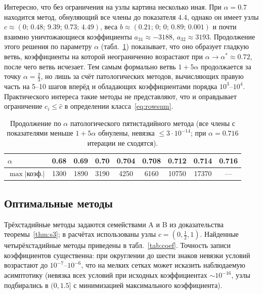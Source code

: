 \documentclass[11pt,a4paper]{article}
\theoremstyle{plain}
\theoremstyle{definition}
\begin{document}
Интересно, что без ограничения на узлы картина несколько иная. При $\alpha=0.7$ находится метод, обнуляющий все члены до показателя $4.4$, однако он имеет узлы $c\approx(0;\,0.48;\,9.39;\,0.73;\,4.49)$, веса $b\approx(0.21;\,0;\,0;\,0.89;\,0.001)$ и почти взаимно уничтожающиеся коэффициенты $a_{31}\approx-3188$, $a_{32}\approx3193$. Продолжение этого решения по параметру $\alpha$ (табл.~\ref{tab:path}) показывает, что оно образует гладкую ветвь, коэффициенты на которой неограниченно возрастают при $\alpha\to\alpha^*\approx0.72$, после чего ветвь исчезает. Тем самым формально ветвь $1+5\alpha$ продолжается за точку $\alpha=\frac23$, но лишь за счёт патологических методов, вычисляющих правую часть на 5--10 шагов вперёд и обладающих коэффициентами порядка $10^3$--$10^4$. Практического интереса такие методы не представляют, что и оправдывает ограничение $c_i\le\hat c$ в определении класса~\eqref{eq:rowsum}.

\begin{table}[ht]
\centering\small
\caption{Продолжение по $\alpha$ патологического пятистадийного метода (все члены с показателями меньше $1+5\alpha$ обнулены, невязка $\le3\cdot10^{-14}$; при $\alpha=0.716$ итерации не сходятся).}\label{tab:path}
\begin{tabular}{lcccccccc}
\toprule
$\alpha$ & 0.68 & 0.69 & 0.70 & 0.704 & 0.708 & 0.712 & 0.714 & 0.716\\
\midrule
$\max|\text{коэф.}|$ & 1300 & 1890 & 3190 & 4250 & 6160 & 10750 & 17370 & ---\\
\bottomrule
\end{tabular}
\end{table}

\subsection{Оптимальные методы}\label{sec:opt}

Трёхстадийные методы задаются семействами A и B из доказательства теоремы~\ref{thm:s3}; в расчётах использованы узлы $c=(0,\frac12,1)$. Найденные четырёхстадийные методы приведены в табл.~\ref{tab:coef}. Точность записи коэффициентов существенна: при округлении до шести знаков невязки условий возрастают до $10^{-7}$--$10^{-6}$, что на мелких сетках может исказить наблюдаемую асимптотику (невязка всех условий при исходных коэффициентах $\sim10^{-16}$, узлы подбирались в $(0,1.5]$ с минимизацией максимального коэффициента).
\end{document}
